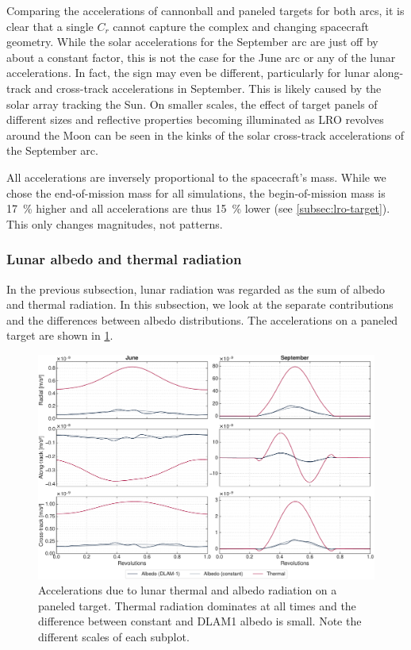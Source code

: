 Comparing the accelerations of cannonball and paneled targets for both arcs, it is clear that a single $C_r$ cannot capture the complex and changing spacecraft geometry. While the solar accelerations for the September arc are just off by about a constant factor, this is not the case for the June arc or any of the lunar accelerations. In fact, the sign may even be different, particularly for lunar along-track and cross-track accelerations in September. This is likely caused by the solar array tracking the Sun. On smaller scales, the effect of target panels of different sizes and reflective properties becoming illuminated as \gls{LRO} revolves around the Moon can be seen in the kinks of the solar cross-track accelerations of the September arc.

All accelerations are inversely proportional to the spacecraft's mass. While we chose the end-of-mission mass for all simulations, the begin-of-mission mass is \qty{17}{\percent} higher and all accelerations are thus \qty{15}{\percent} lower (see \cref{subsec:lro-target}). This only changes magnitudes, not patterns.





\subsubsection{Lunar albedo and thermal radiation}
In the previous subsection, lunar radiation was regarded as the sum of albedo and thermal radiation. In this subsection, we look at the separate contributions and the differences between albedo distributions. The accelerations on a paneled target are shown in \cref{fig:acc-albedovsthermal}.

\begin{figure}[tb]
    \centering
    \includegraphics[width=\textwidth]{figures/plots/acc_albedovsthermal.pdf}

    \caption{Accelerations due to lunar thermal and albedo radiation on a paneled target. Thermal radiation dominates at all times and the difference between constant and \gls{DLAM1} albedo is small. Note the different scales of each subplot.}
    \label{fig:acc-albedovsthermal}
\end{figure}

